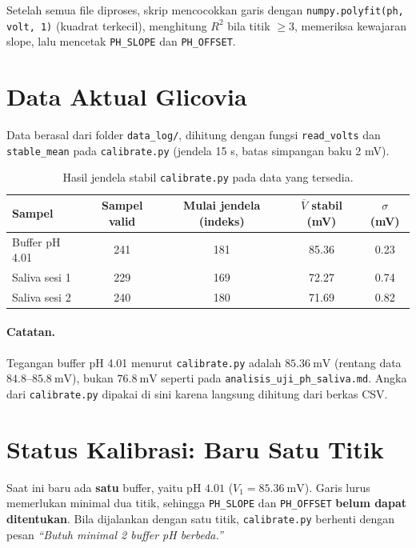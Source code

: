 \documentclass[12pt,a4paper]{article}
\begin{document}
Setelah semua file diproses, skrip mencocokkan garis dengan \texttt{numpy.polyfit(ph, volt, 1)} (kuadrat terkecil), menghitung $R^2$ bila titik $\geq 3$, memeriksa kewajaran slope, lalu mencetak \texttt{PH\_SLOPE} dan \texttt{PH\_OFFSET}.

\section{Data Aktual Glicovia}

Data berasal dari folder \texttt{data\_log/}, dihitung dengan fungsi \texttt{read\_volts} dan \texttt{stable\_mean} pada \texttt{calibrate.py} (jendela 15 s, batas simpangan baku 2 mV).

\begin{table}[h]
\centering
\begin{tabular}{@{}lcccc@{}}
\toprule
Sampel & Sampel valid & Mulai jendela (indeks) & $\overline{V}$ stabil (mV) & $\sigma$ (mV) \\
\midrule
Buffer pH 4.01 & 241 & 181 & 85.36 & 0.23 \\
Saliva sesi 1  & 229 & 169 & 72.27 & 0.74 \\
Saliva sesi 2  & 240 & 180 & 71.69 & 0.82 \\
\bottomrule
\end{tabular}
\caption{Hasil jendela stabil \texttt{calibrate.py} pada data yang tersedia.}
\end{table}

\paragraph{Catatan.} Tegangan buffer pH 4.01 menurut \texttt{calibrate.py} adalah $85.36\ \text{mV}$ (rentang data $84.8$--$85.8\ \text{mV}$), bukan $76.8\ \text{mV}$ seperti pada \texttt{analisis\_uji\_ph\_saliva.md}. Angka dari \texttt{calibrate.py} dipakai di sini karena langsung dihitung dari berkas CSV.

\section{Status Kalibrasi: Baru Satu Titik}

Saat ini baru ada \textbf{satu} buffer, yaitu pH $4.01$ ($V_1 = 85.36\ \text{mV}$). Garis lurus memerlukan minimal dua titik, sehingga \texttt{PH\_SLOPE} dan \texttt{PH\_OFFSET} \textbf{belum dapat ditentukan}. Bila dijalankan dengan satu titik, \texttt{calibrate.py} berhenti dengan pesan \textit{``Butuh minimal 2 buffer pH berbeda.''}
\end{document}
